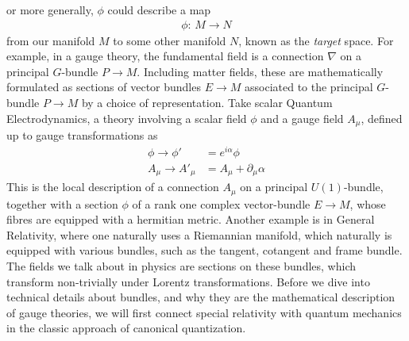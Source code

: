 or more generally, $\phi$ could describe a map
\begin{align}
    \phi:\,M\rightarrow N
\end{align}
from our manifold $M$ to some other manifold $N$, known as the \emph{target} space. For example, in a gauge theory, the fundamental field is a connection $\nabla$ on a principal $G$-bundle $P\rightarrow M$. Including matter fields, these are mathematically formulated as sections of vector bundles $E\rightarrow M$ associated to the principal $G$-bundle $P\rightarrow M$ by a choice of representation. Take scalar Quantum Electrodynamics, a theory involving a scalar field $\phi$ and a gauge field $A_{\mu}$, defined up to gauge transformations as
\begin{align}
    \phi\rightarrow \phi'&=e^{i\alpha}\phi
    \\
    A_{\mu}\rightarrow A'_{\mu}&=A_{\mu}+\partial_{\mu}\alpha
\end{align}
This is the local description of a connection $A_{\mu}$ on a principal $U(1)$-bundle, together with a section $\phi$ of a rank one complex vector-bundle $E\rightarrow M$, whose fibres are equipped with a hermitian metric. Another example is in General Relativity, where one naturally uses a Riemannian manifold, which naturally is equipped with various bundles, such as the tangent, cotangent and frame bundle. The fields we talk about in physics are sections on these bundles, which transform non-trivially under Lorentz transformations. Before we dive into technical details about bundles, and why they are the mathematical description of gauge theories, we will first connect special relativity with quantum mechanics in the classic approach of canonical quantization.